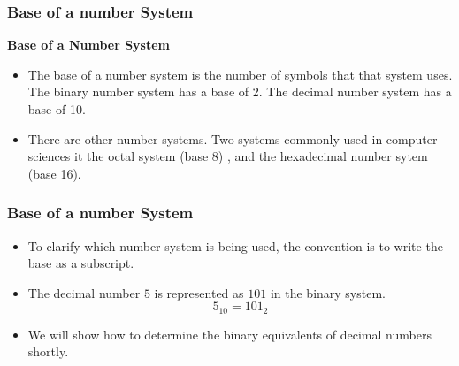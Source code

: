 \documentclass{beamer}
\begin{document}
\begin{frame}
\frametitle{Base of a number System}
\Large
\textbf{Base of a Number System}
\begin{itemize}
\item The base of a number system is the number of symbols that that system uses. The binary number system has a base of 2. The decimal number system has a base of 10.
\item There are other number systems. Two systems commonly used in computer sciences it the octal system (base 8)
, and the hexadecimal number sytem (base 16).
\end{itemize}

\end{frame}
\begin{frame}
\frametitle{Base of a number System}
\Large
\begin{itemize}
\item To clarify which number system is being used, the convention is to write the base as a subscript.
\item The decimal number $5$ is represented as $101$ in the binary system.
\[5_{10} = 101_2\]
\item We will show how to determine the binary equivalents of decimal numbers shortly.
\end{itemize}


\end{frame}
\begin{frame}



\end{frame}
\begin{frame}



\end{frame}
\end{document}
